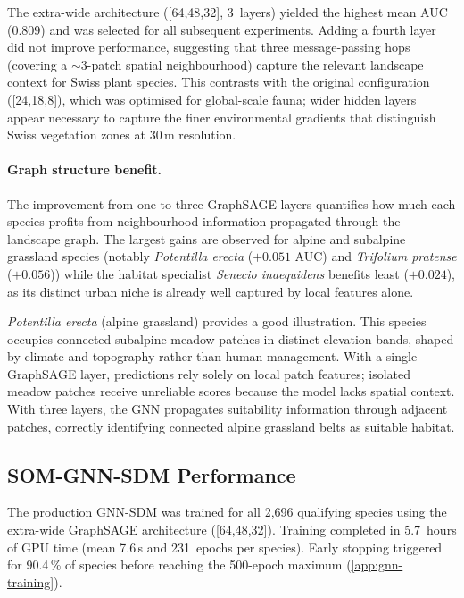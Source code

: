 The extra-wide architecture ({[}64,48,32{]}, 3~layers) yielded the
highest mean AUC (0.809) and was selected for all subsequent
experiments.  Adding a fourth layer did not improve performance,
suggesting that three message-passing hops (covering a
${\sim}$3-patch spatial neighbourhood) capture the relevant
landscape context for Swiss plant species.  This contrasts with
the original \cite{Wu2025} configuration ({[}24,18,8{]}),
which was optimised for global-scale fauna; wider hidden layers
appear necessary to capture the finer environmental gradients
that distinguish Swiss vegetation zones at 30\,m resolution.

\paragraph{Graph structure benefit.}
The improvement from one to three GraphSAGE layers quantifies how
much each species profits from neighbourhood information
propagated through the landscape graph. The largest gains are
observed for alpine and subalpine grassland species (notably
\textit{Potentilla erecta} ($+0.051$ AUC) and \textit{Trifolium
pratense} ($+0.056$)) while the habitat specialist
\textit{Senecio inaequidens} benefits least ($+0.024$), as its
distinct urban niche is already well captured by local features
alone.

\textit{Potentilla erecta} (alpine grassland) provides a
good illustration. This species occupies connected
subalpine meadow patches in distinct elevation bands, shaped by
climate and topography rather than human management. With a
single GraphSAGE layer, predictions rely solely on local patch
features; isolated meadow patches receive unreliable scores
because the model lacks spatial context. With three layers, the
GNN propagates suitability information through adjacent patches,
correctly identifying connected alpine grassland belts as
suitable habitat.

\subsection{SOM-GNN-SDM Performance}
\label{sec:gnn-results}

The production GNN-SDM was trained for all 2,696 qualifying
species using the extra-wide GraphSAGE architecture
({[}64,48,32{]}). Training completed in 5.7~hours of GPU time
(mean 7.6\,s and 231~epochs per species). Early stopping
triggered for 90.4\,\% of species before reaching the 500-epoch
maximum (\cref{app:gnn-training}).

